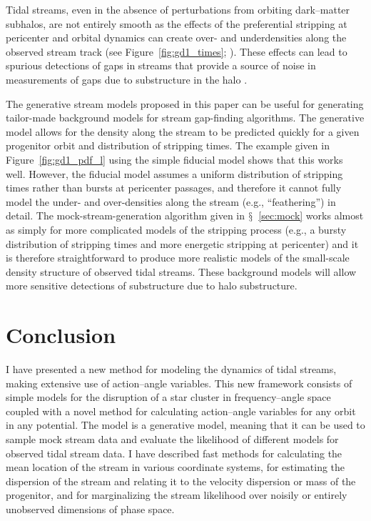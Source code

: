 \documentclass{emulateapj}
\newcommand{\eg}{e.g.}
\renewcommand{\figurename}{Figure}
\newcommand{\sectionname}{$\mathsection$}
\begin{document}
Tidal streams, even in the absence of perturbations from orbiting
dark--matter subhalos, are not entirely smooth as the effects of the
preferential stripping at pericenter and orbital dynamics can create
over- and underdensities along the observed stream track (see
\figurename~\ref{fig:gd1_times}; \citealt{Kuepper10a}). These effects
can lead to spurious detections of gaps in streams that provide a
source of noise in measurements of gaps due to substructure in the
halo \citep{Ngan14a}. 

The generative stream models proposed in this paper can be useful for
generating tailor-made background models for stream gap-finding
algorithms. The generative model allows for the density along the
stream to be predicted quickly for a given progenitor orbit and
distribution of stripping times. The example given in
\figurename~\ref{fig:gd1_pdf_l} using the simple fiducial model shows
that this works well. However, the fiducial model assumes a uniform
distribution of stripping times rather than bursts at pericenter
passages, and therefore it cannot fully model the under- and
over-densities along the stream (\eg, ``feathering'') in detail. The
mock-stream-generation algorithm given in \sectionname~\ref{sec:mock}
works almost as simply for more complicated models of the stripping
process (\eg, a bursty distribution of stripping times and more
energetic stripping at pericenter) and it is therefore straightforward
to produce more realistic models of the small-scale density structure
of observed tidal streams. These background models will allow more
sensitive detections of substructure due to halo substructure.

\section{Conclusion}\label{sec:conclusion}

I have presented a new method for modeling the dynamics of tidal
streams, making extensive use of action--angle variables. This new
framework consists of simple models for the disruption of a star
cluster in frequency--angle space coupled with a novel method for
calculating action--angle variables for any orbit in any
potential. The model is a generative model, meaning that it can be
used to sample mock stream data and evaluate the likelihood of
different models for observed tidal stream data. I have described fast
methods for calculating the mean location of the stream in various
coordinate systems, for estimating the dispersion of the stream and
relating it to the velocity dispersion or mass of the progenitor, and
for marginalizing the stream likelihood over noisily or entirely
unobserved dimensions of phase space.
\end{document}
